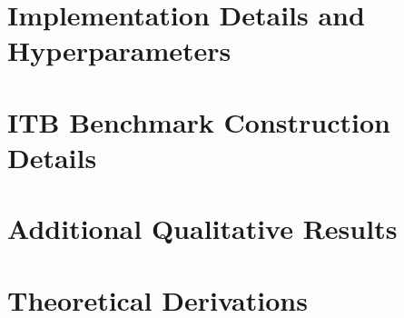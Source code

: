 
\section{Implementation Details and Hyperparameters}
\label{app:hyper}



\section{ITB Benchmark Construction Details}
\label{app:itb}



\section{Additional Qualitative Results}
\label{app:qual}



\section{Theoretical Derivations}
\label{app:theory}


